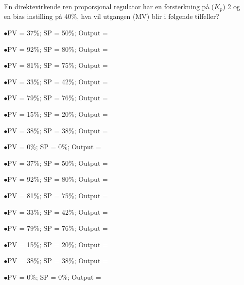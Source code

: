


En direktevirkende ren proporsjonal regulator har en forsterkning p{\aa} ($K_p$) 2 og en bias instilling p{\aa} 40\%, hva vil utgangen (MV) blir i f{\o}lgende tilfeller? 

\medskip 
\item{$\bullet$}PV = 37\%; SP = 50\%; Output = \underbar{\hskip 50pt}
\vskip 5pt
\item{$\bullet$}PV = 92\%; SP = 80\%; Output = \underbar{\hskip 50pt}
\vskip 5pt
\item{$\bullet$}PV = 81\%; SP = 75\%; Output = \underbar{\hskip 50pt}
\vskip 5pt
\item{$\bullet$}PV = 33\%; SP = 42\%; Output = \underbar{\hskip 50pt}
\vskip 5pt
\item{$\bullet$}PV = 79\%; SP = 76\%; Output = \underbar{\hskip 50pt}
\vskip 5pt
\item{$\bullet$}PV = 15\%; SP = 20\%; Output = \underbar{\hskip 50pt}
\vskip 5pt
\item{$\bullet$}PV = 38\%; SP = 38\%; Output = \underbar{\hskip 50pt}
\vskip 5pt
\item{$\bullet$}PV = 0\%; SP = 0\%; Output = \underbar{\hskip 50pt}
\medskip 







\medskip 
\item{$\bullet$}PV = 37\%; SP = 50\%; Output = 
\vskip 5pt
\item{$\bullet$}PV = 92\%; SP = 80\%; Output = 
\vskip 5pt
\item{$\bullet$}PV = 81\%; SP = 75\%; Output = 
\vskip 5pt
\item{$\bullet$}PV = 33\%; SP = 42\%; Output = 
\vskip 5pt
\item{$\bullet$}PV = 79\%; SP = 76\%; Output = 
\vskip 5pt
\item{$\bullet$}PV = 15\%; SP = 20\%; Output = 
\vskip 5pt
\item{$\bullet$}PV = 38\%; SP = 38\%; Output = 
\vskip 5pt
\item{$\bullet$}PV = 0\%; SP = 0\%; Output = 
\medskip 












